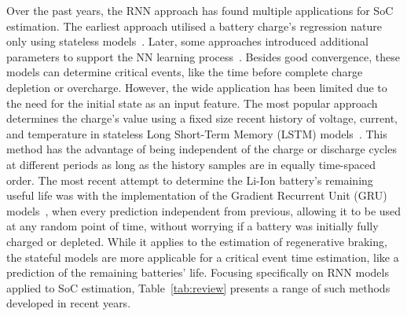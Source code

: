 % 
Over the past years, the RNN approach has found multiple applications for SoC estimation.
The earliest approach utilised a battery charge's regression nature only using stateless models~\cite{song_lithium-ion_2018,jiao_gru-rnn_2020,xiao_accurate_2019}.%
Later, some approaches introduced additional parameters to support the NN learning process~\cite{mamo_long_2020,jiao_gru-rnn_2020,javid_adaptive_2020}.
Besides good convergence, these models can determine critical events, like the time before complete charge depletion or overcharge.
However, the wide application has been limited due to the need for the initial state as an input feature.
The most popular approach determines the charge's value using a fixed size recent history of voltage, current, and temperature in stateless Long Short-Term Memory (LSTM) models~\cite{Chemali2017,mamo_long_2020,javid_adaptive_2020,zhang_deep_2020}.
This method has the advantage of being independent of the charge or discharge cycles at different periods as long as the history samples are in equally time-spaced order.
The most recent attempt to determine the Li-Ion battery's remaining useful life was with the implementation of the Gradient Recurrent Unit (GRU) models~\cite{song_lithium-ion_2018,javid_adaptive_2020,xiao_accurate_2019,jiao_gru-rnn_2020}, when every prediction independent from previous, allowing it to be used at any random point of time, without worrying if a battery was initially fully charged or depleted.
While it applies to the estimation of regenerative braking, the stateful models are more applicable for a critical event time estimation, like a prediction of the remaining batteries' life.
Focusing specifically on RNN models applied to SoC estimation, \mbox{Table~\ref{tab:review}} presents a range of such methods developed in recent years.

